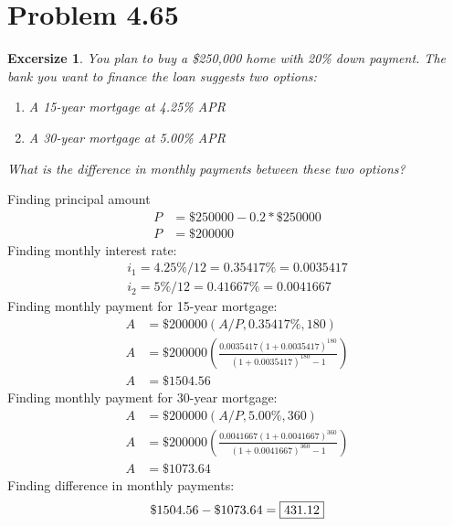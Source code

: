 \documentclass[../INDE250HW.tex]{subfiles}
\newtheorem{exrc}{Excersize}
\begin{document}
\newpage
\section*{Problem 4.65}
\begin{exrc}
    You plan to buy a \$250,000 home with 20\% down payment. The bank you want to finance the loan suggests two options:
    \begin{enumerate}
        \item A 15-year mortgage at 4.25\% APR
        \item A 30-year mortgage at 5.00\% APR
    \end{enumerate}
    What is the difference in monthly payments between these two options?
\end{exrc}
Finding principal amount
\begin{equation*}
    \begin{aligned}
        P &= \$250000 - 0.2 * \$250000 \\
        P &= \$200000
    \end{aligned}
\end{equation*}
Finding monthly interest rate:
\begin{equation*}
    \begin{aligned}
        i_1 = 4.25\%/12 = 0.35417\% = 0.0035417 \\
        i_2 = 5\%/12 = 0.41667\% = 0.0041667
    \end{aligned}
\end{equation*}
Finding monthly payment for 15-year mortgage:
\begin{equation*}
    \begin{aligned}
        A &= \$200000(A/P,0.35417\%,180) \\
        A &= \$200000\left(\frac{0.0035417(1+0.0035417)^{180}}{(1+0.0035417)^{180}-1}\right) \\
        A &= \$1504.56
    \end{aligned}
\end{equation*} 
Finding monthly payment for 30-year mortgage:
\begin{equation*}
    \begin{aligned}
        A &= \$200000(A/P,5.00\%,360) \\
        A &= \$200000\left(\frac{0.0041667(1+0.0041667)^{360}}{(1+0.0041667)^{360}-1}\right) \\
        A &= \$1073.64
    \end{aligned}
\end{equation*}
Finding difference in monthly payments:
\begin{equation*}
    \begin{aligned}
        \$1504.56 - \$1073.64 = \framebox{$431.12$}
    \end{aligned}
\end{equation*}
\end{document}
